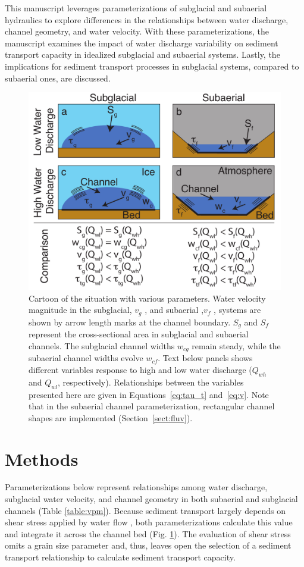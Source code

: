 \documentclass[11pt]{article}
\begin{document}
\begin{spacing}{1}
  This manuscript leverages parameterizations of subglacial and subaerial hydraulics to explore differences in the relationships between  water discharge, channel geometry, and water velocity. 
  With these parameterizations, the manuscript examines the impact of water discharge variability on sediment transport capacity in idealized subglacial and subaerial systems.
  Lastly, the implications for sediment transport processes in subglacial systems, compared to subaerial ones, are discussed.
  
  \begin{center}
    \begin{figure}[H]
      \includegraphics[width=0.65\linewidth]{Cartoon_text.pdf}
      \caption{Cartoon of the situation with various parameters. Water velocity magnitude in the subglacial, $v_g$ , and subaerial ,$v_f$ , systems are shown by arrow length marks at the channel boundary. $S_g$ and $S_f$ represent the cross-sectional area in subglacial and subaerial channels. The subglacial channel widths $w_{cg}$ remain steady, while the subaerial channel widths evolve $w_{cf}$. Text below panels shows different variables response to high and low water discharge ($Q_{wh}$ and $Q_{wl}$, respectively).
        Relationships between the variables presented here are given in Equations~\ref{eq:tau_t} and~\ref{eq:v}.
        Note that in the subaerial channel parameterization, rectangular channel shapes are implemented (Section~\ref{sect:fluv}).} 
      \label{fig:cartoon}
    \end{figure}
  \end{center}


  
  \section{Methods}
  \label{sect:meth}
    Parameterizations below represent relationships among water discharge, subglacial water velocity, and channel geometry in both subaerial and subglacial channels (Table \ref{table:vpm}).
  Because sediment transport largely depends on shear stress applied by water flow \citep{shields1936}, both parameterizations calculate this value and integrate  it across the channel bed (Fig. \ref{fig:cartoon}).
  The evaluation of shear stress  omits a grain size parameter and, thus, leaves open the selection of a sediment transport relationship  \citep[e.g.][]{shields1936,meyer1948} to  calculate sediment transport capacity.


\end{spacing}
\end{document}
